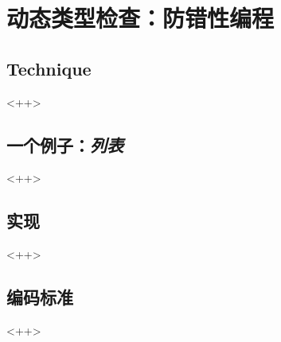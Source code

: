 

\chapter{动态类型检查：防错性编程}

\section{Technique}<++>

\section{一个例子：\emph{列表}}<++>

\section{实现}<++>

\section{编码标准}<++>

